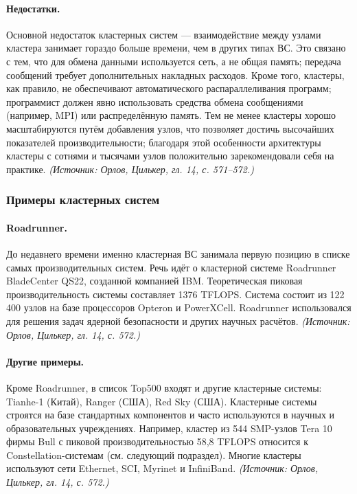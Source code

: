 \documentclass[a4paper,12pt]{article}
\begin{document}
\paragraph{Недостатки.}
Основной недостаток кластерных систем — взаимодействие между узлами кластера занимает гораздо больше времени, чем в других типах ВС. Это связано с тем, что для обмена данными используется сеть, а не общая память; передача сообщений требует дополнительных накладных расходов. Кроме того, кластеры, как правило, не обеспечивают автоматического распараллеливания программ; программист должен явно использовать средства обмена сообщениями (например, MPI) или распределённую память. Тем не менее кластеры хорошо масштабируются путём добавления узлов, что позволяет достичь высочайших показателей производительности; благодаря этой особенности архитектуры кластеры с сотнями и тысячами узлов положительно зарекомендовали себя на практике.
\textit{(Источник: Орлов, Цилькер, гл. 14, с. 571--572.)}

\subsubsection{Примеры кластерных систем}

\paragraph{Roadrunner.}
До недавнего времени именно кластерная ВС занимала первую позицию в списке самых производительных систем. Речь идёт о кластерной системе Roadrunner BladeCenter QS22, созданной компанией IBM. Теоретическая пиковая производительность системы составляет 1376 TFLOPS. Система состоит из 122\,400 узлов на базе процессоров Opteron и PowerXCell. Roadrunner использовался для решения задач ядерной безопасности и других научных расчётов.
\textit{(Источник: Орлов, Цилькер, гл. 14, с. 572.)}

\paragraph{Другие примеры.}
Кроме Roadrunner, в список Top500 входят и другие кластерные системы: Tianhe-1 (Китай), Ranger (США), Red Sky (США). Кластерные системы строятся на базе стандартных компонентов и часто используются в научных и образовательных учреждениях. Например, кластер из 544 SMP-узлов Tera 10 фирмы Bull с пиковой производительностью 58,8 TFLOPS относится к Constellation-системам (см. следующий подраздел). Многие кластеры используют сети Ethernet, SCI, Myrinet и InfiniBand.
\textit{(Источник: Орлов, Цилькер, гл. 14, с. 572.)}
\end{document}
